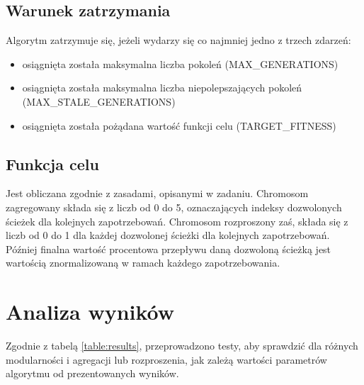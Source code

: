 \subsection{Warunek zatrzymania}

Algorytm zatrzymuje się, jeżeli wydarzy się co najmniej jedno z trzech zdarzeń:
\begin{itemize}
    \item osiągnięta została maksymalna liczba pokoleń (MAX\_GENERATIONS)
    \item osiągnięta została maksymalna liczba niepolepszających pokoleń (MAX\_STALE\_GENERATIONS)
    \item osiągnięta została pożądana wartość funkcji celu (TARGET\_FITNESS)
\end{itemize}

\subsection{Funkcja celu}

Jest obliczana zgodnie z zasadami, opisanymi w zadaniu. Chromosom zagregowany składa się z liczb od 0 do 5, oznaczających indeksy dozwolonych ścieżek dla kolejnych zapotrzebowań. Chromosom rozproszony zaś, składa się z liczb od 0 do 1 dla każdej dozwolonej ścieżki dla kolejnych zapotrzebowań. Później finalna wartość procentowa przepływu daną dozwoloną ścieżką jest wartością znormalizowaną w ramach każdego zapotrzebowania.

\section{Analiza wyników}

Zgodnie z tabelą \ref{table:results}, przeprowadzono testy, aby sprawdzić dla różnych modularności  i agregacji lub rozproszenia, jak zależą wartości parametrów algorytmu od prezentowanych wyników. 

